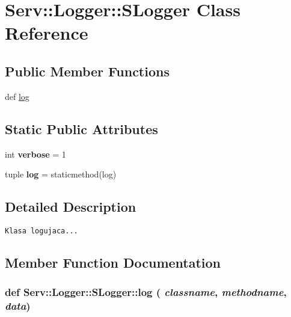 \hypertarget{class_serv_1_1_logger_1_1_s_logger}{
\section{Serv::Logger::SLogger Class Reference}
\label{class_serv_1_1_logger_1_1_s_logger}
}
\subsection*{Public Member Functions}
\begin{CompactItemize}
\item 
def \hyperlink{class_serv_1_1_logger_1_1_s_logger_821ba8137f28c84fc02cbea799e116e7}{log}
\end{CompactItemize}
\subsection*{Static Public Attributes}
\begin{CompactItemize}
\item 
\hypertarget{class_serv_1_1_logger_1_1_s_logger_f3de589fbea73bb60b3be962c3b5edea}{
int \textbf{verbose} = 1}
\label{class_serv_1_1_logger_1_1_s_logger_f3de589fbea73bb60b3be962c3b5edea}

\item 
\hypertarget{class_serv_1_1_logger_1_1_s_logger_fab0c68bcef6d0e5e1f10ec2e986396c}{
tuple \textbf{log} = staticmethod(log)}
\label{class_serv_1_1_logger_1_1_s_logger_fab0c68bcef6d0e5e1f10ec2e986396c}

\end{CompactItemize}


\subsection{Detailed Description}


\footnotesize\begin{verbatim}
Klasa logujaca...
\end{verbatim}
\normalsize
 

\subsection{Member Function Documentation}
\hypertarget{class_serv_1_1_logger_1_1_s_logger_821ba8137f28c84fc02cbea799e116e7}{
\subsubsection[{log}]{\setlength{\rightskip}{0pt plus 5cm}def Serv::Logger::SLogger::log ( {\em classname}, \/   {\em methodname}, \/   {\em data})}}
\label{class_serv_1_1_logger_1_1_s_logger_821ba8137f28c84fc02cbea799e116e7}




